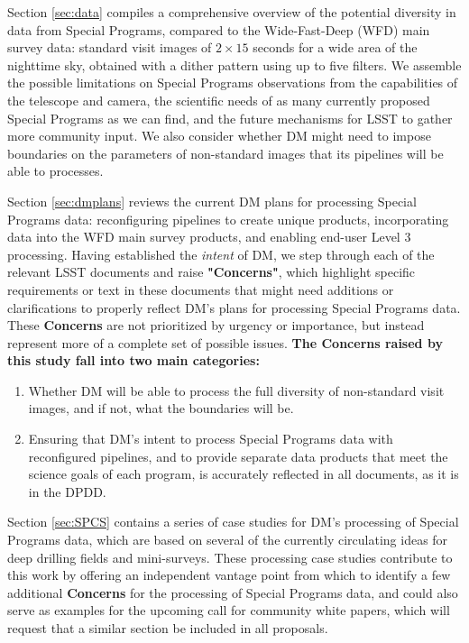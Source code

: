 \documentclass[DM,lsstdraft,toc]{lsstdoc}
\begin{document}
Section \ref{sec:data} compiles a comprehensive overview of the potential diversity in data from Special Programs, compared to the Wide-Fast-Deep (WFD) main survey data: standard visit images of $2\times15$ seconds for a wide area of the nighttime sky, obtained with a dither pattern using up to five filters. We assemble the possible limitations on Special Programs observations from the capabilities of the telescope and camera, the scientific needs of as many currently proposed Special Programs as we can find, and the future mechanisms for LSST to gather more community input. We also consider whether DM might need to impose boundaries on the parameters of non-standard images that its pipelines will be able to processes.

Section \ref{sec:dmplans} reviews the current DM plans for processing Special Programs data: reconfiguring pipelines to create unique products, incorporating data into the WFD main survey products, and enabling end-user Level 3 processing. Having established the {\it intent} of DM, we step through each of the relevant LSST documents and raise {\bf "Concerns"}, which highlight specific requirements or text in these documents that might need additions or clarifications to properly reflect DM's plans for processing Special Programs data. These {\bf Concerns} are not prioritized by urgency or importance, but instead represent more of a complete set of possible issues. {\bf The Concerns raised by this study fall into two main categories:}
\begin{enumerate}
\item Whether DM will be able to process the full diversity of non-standard visit images, and if not, what the boundaries will be.
\item Ensuring that DM's intent to process Special Programs data with reconfigured pipelines, and to provide separate data products that meet the science goals of each program, is accurately reflected in all documents, as it is in the DPDD.
\end{enumerate}

Section \ref{sec:SPCS} contains a series of case studies for DM's processing of Special Programs data, which are based on several of the currently circulating ideas for deep drilling fields and mini-surveys. These processing case studies contribute to this work by offering an independent vantage point from which to identify a few additional {\bf Concerns} for the processing of Special Programs data, and could also serve as examples for the upcoming call for community white papers, which will request that a similar section be included in all proposals.
\end{document}
